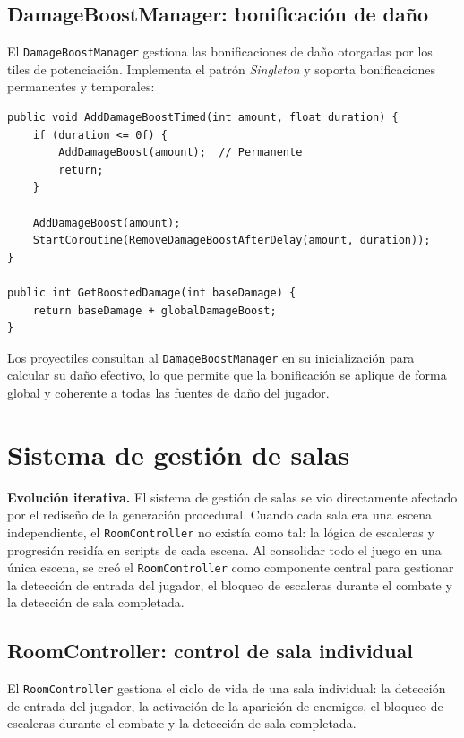 \subsection{DamageBoostManager: bonificación de daño}


El \texttt{DamageBoostManager} gestiona las bonificaciones de daño otorgadas por los tiles de potenciación. Implementa el patrón \textit{Singleton} y soporta bonificaciones permanentes y temporales:

\begin{lstlisting}
public void AddDamageBoostTimed(int amount, float duration) {
    if (duration <= 0f) {
        AddDamageBoost(amount);  // Permanente
        return;
    }
    
    AddDamageBoost(amount);
    StartCoroutine(RemoveDamageBoostAfterDelay(amount, duration));
}

public int GetBoostedDamage(int baseDamage) {
    return baseDamage + globalDamageBoost;
}
\end{lstlisting}


Los proyectiles consultan al \texttt{DamageBoostManager} en su inicialización para calcular su daño efectivo, lo que permite que la bonificación se aplique de forma global y coherente a todas las fuentes de daño del jugador.



\section{Sistema de gestión de salas}


\textbf{Evolución iterativa.} El sistema de gestión de salas se vio directamente afectado por el rediseño de la generación procedural. Cuando cada sala era una escena independiente, el \texttt{RoomController} no existía como tal: la lógica de escaleras y progresión residía en scripts de cada escena. Al consolidar todo el juego en una única escena, se creó el \texttt{RoomController} como componente central para gestionar la detección de entrada del jugador, el bloqueo de escaleras durante el combate y la detección de sala completada.

\subsection{RoomController: control de sala individual}


El \texttt{RoomController} gestiona el ciclo de vida de una sala individual: la detección de entrada del jugador, la activación de la aparición de enemigos, el bloqueo de escaleras durante el combate y la detección de sala completada.

